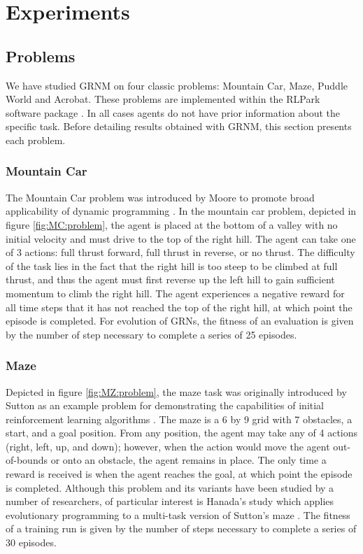 \section{Experiments}


\subsection{Problems}

We have studied GRNM on four classic problems: Mountain Car, Maze, Puddle World and Acrobat. These problems are implemented within the RLPark software package \cite{Degris2014}. In all cases agents do not have prior information about the specific task. Before detailing results obtained with GRNM, this section presents each problem.
\subsubsection{Mountain Car}
The Mountain Car problem was introduced by Moore to promote broad applicability of dynamic programming \cite{Moore1991}. In the mountain car problem, depicted in figure \ref{fig:MC:problem}, the agent is placed at the bottom of a valley with no initial velocity and must drive to the top of the right hill. The agent can take one of 3 actions: full thrust forward, full thrust in reverse, or no thrust. The difficulty of the task lies in the fact that the right hill is too steep to be climbed at full thrust, and thus the agent must first reverse up the left hill to gain sufficient momentum to climb the right hill. The agent experiences a negative reward for all time steps that it has not reached the top of the right hill, at which point the episode is completed. For evolution of GRNs, the fitness of an evaluation is given by the number of step necessary to complete a series of 25 episodes.

\subsubsection{Maze}

Depicted in figure \ref{fig:MZ:problem}, the maze task was originally introduced by Sutton as an example problem for demonstrating the capabilities of initial reinforcement learning algorithms \cite{Sutton1990}. The maze is a 6 by 9 grid with 7 obstacles, a start, and a goal position. From any position, the agent may take any of 4 actions (right, left, up, and down); however, when the action would move the agent out-of-bounds or onto an obstacle, the agent remains in place. The only time a reward is received is when the agent reaches the goal, at which point the episode is completed. Although this problem and its variants have been studied by a number of researchers, of particular interest is Hanada's study which applies evolutionary programming to a multi-task version of Sutton's maze \cite{Handa2007}. The fitness of a training run is given by the number of steps necessary to complete a series of 30 episodes.

